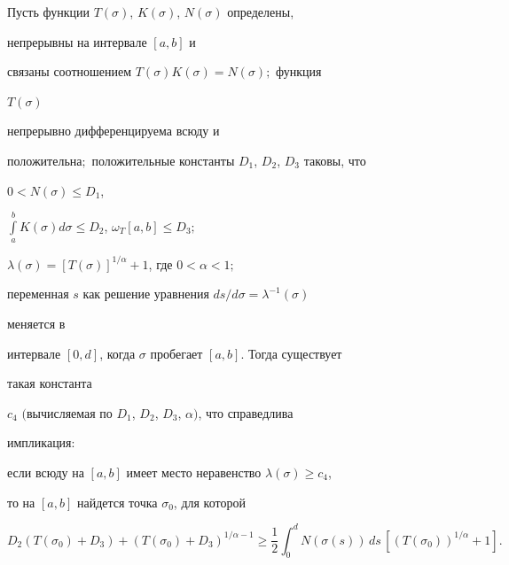  


\begin{lem} 


Пусть функции $T(\sigma)$, $K(\sigma)$, $N(\sigma)$ определены, 


непрерывны на интервале $[a,b]$ и 


связаны соотношением $T(\sigma)K(\sigma)=N(\sigma);$ функция 


$T(\sigma)$ 


непрерывно дифференцируема всюду и 


положительна$;$ положительные константы $D_1$, $D_2$, $D_3$ таковы, что 


$0<N(\sigma)\le D_1$, 


$\int\limits^b_a K(\sigma)d\sigma\le D_2$, $\omega_T[a,b]\le D_3;$ 


$\lambda(\sigma)=[T(\sigma)]^{1/\alpha}+1$, где $0<\alpha<1;$ 


переменная $s$ как решение уравнения $ds/d\sigma=\lambda^{-1}(\sigma)$ 


меняется в 


интервале $[0,d]$, когда $\sigma$ пробегает $[a,b]$. Тогда существует 


такая константа 


$c_4$ $($вычисляемая по $D_1$, $D_2$, $D_3$, $\alpha)$, что справедлива 


импликация$:$ 


если всюду на $[a,b]$ имеет место неравенство $\lambda(\sigma)\ge c_4$,


то на $[a,b]$ найдется точка $\sigma_0$, для которой


\begin{equation} 


D_2(T(\sigma_0)+D_3)+ 


(T(\sigma_0)+D_3)^{1/\alpha-1}\ge\frac{1}{2} 


\int^d_0 N(\sigma(s))\,ds\, 


[(T(\sigma_0))^{1/\alpha}+1]. 


\end{equation} 


\end{lem} 


 


